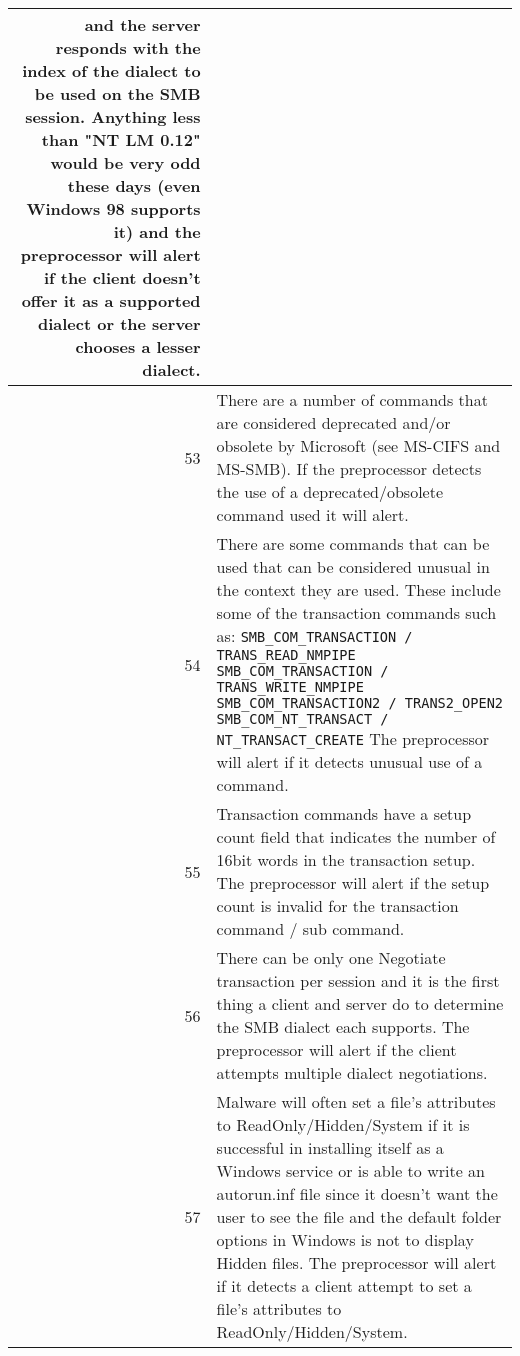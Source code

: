 \documentclass[english]{report}
\begin{document}
\begin{itemize}
\begin{longtable}{|r|p{13.5cm}|}
      and the server responds with the index of the dialect to be used on
      the SMB session.  Anything less than "NT LM 0.12" would be very odd
      these days (even Windows 98 supports it) and the preprocessor will
      alert if the client doesn't offer it as a supported dialect or the
      server chooses a lesser dialect.\\
\hline
 53 & There are a number of commands that are considered deprecated and/or
       obsolete by Microsoft (see MS-CIFS and MS-SMB).  If the preprocessor
       detects the use of a deprecated/obsolete command used it will alert.\\
\hline
 54 & There are some commands that can be used that can be considered unusual
      in the context they are used.  These include some of the transaction
      commands such as:
      \texttt{SMB\_COM\_TRANSACTION / TRANS\_READ\_NMPIPE}
      \texttt{SMB\_COM\_TRANSACTION / TRANS\_WRITE\_NMPIPE}
      \texttt{SMB\_COM\_TRANSACTION2 / TRANS2\_OPEN2}
      \texttt{SMB\_COM\_NT\_TRANSACT / NT\_TRANSACT\_CREATE}
      The preprocessor will alert if it detects unusual use of a command.\\
\hline
 55 & Transaction commands have a setup count field that indicates the
      number of 16bit words in the transaction setup.  The preprocessor
      will alert if the setup count is invalid for the transaction
      command / sub command.\\
\hline
 56 & There can be only one Negotiate transaction per session and it is the
      first thing a client and server do to determine the SMB dialect each
      supports.  The preprocessor will alert if the client attempts multiple
      dialect negotiations.\\
\hline
 57 & Malware will often set a file's attributes to ReadOnly/Hidden/System if
      it is successful in installing itself as a Windows service or is able to
      write an autorun.inf file since it doesn't want the user to see the file
      and the default folder options in Windows is not to display Hidden files.
      The preprocessor will alert if it detects a client attempt to set a
      file's attributes to ReadOnly/Hidden/System.\\
\hline
\end{longtable}
\end{itemize}
\end{document}
